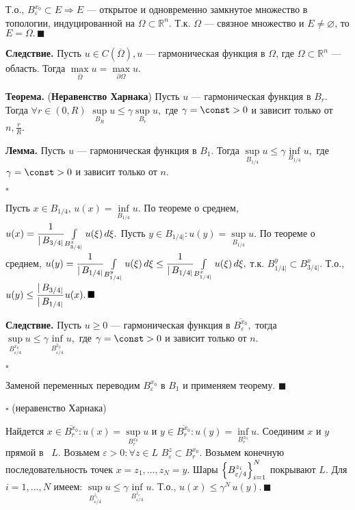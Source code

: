 \documentclass[unicode,12pt,draft]{article}
\begin{document}
Т.о., $B_{\varepsilon}^{x_0}\subset E\Rightarrow E$ --- открытое и
одновременно замкнутое множество в топологии, индуцированной на
$\Omega\subset \mathbb R^n.$ Т.к. $\Omega$ --- связное множество и
$E\ne\varnothing$, то $E=\Omega.\,\blacksquare$

\textbf{Следствие.} Пусть $u\in C(\overline{\Omega}), u$ ---
гармоническая функция в $\Omega$, где $\Omega\subset \mathbb R^n$
--- область. Тогда $\max\limits_{\overline{\Omega}}u=\max\limits_{\partial \Omega}u.$

\textbf{Теорема.} (\textbf{Неравенство Харнака}) Пусть $u$ ---
гармоническая функция в $B_r$. Тогда $\forall r\in (0,R) \,\,
\sup\limits_{B_R}u\le\gamma \sup\limits_{B_r}u,$ где
$\gamma=\const>0$ и зависит только от $n,\frac rR.$

\textbf{Лемма.} Пусть $u$ --- гармоническая функция в $B_1$. Тогда
$\sup\limits_{B_{1/4}}u\le\gamma \inf\limits_{B_{1/4}}u,$ где
$\gamma=\const>0$ и зависит только от $n.$

$\square$

Пусть $x\in B_{1/4},\, u(x)=\inf\limits_{B_{1/4}}u.$ По теореме о
среднем, $u(x)=\cfrac1{|\,B_{3/4|}}\int\limits_{B_{3/4|}^x}
u(\xi)\,d\xi.$ Пусть $y\in B_{1/4|}\colon
u(y)=\sup\limits_{B_{1/4}}u.$ По теореме о среднем,
$u(y)=\cfrac1{|\,B_{1/4|}}\int\limits_{B_{1/4|}^y} u(\xi)\,d\xi\le
\cfrac1{|\,B_{1/4|}}\int\limits_{B_{1/4|}^x} u(\xi)\,d\xi,$ т.к.
$B_{1/4|}^y\subset B_{3/4|}^x$. Т.о., $u(y)\le
\cfrac{|\,B_{3/4|}}{|\,B_{1/4|}}\,u(x).\,\blacksquare$

\textbf{Следствие.} Пусть $u\ge0$ --- гармоническая функция в
$\overline{B_{\varepsilon}^{x_0}},$ тогда
$\sup\limits_{B_{\varepsilon/4}^{x_0}}u\le\gamma
\inf\limits_{\overline{B_{\varepsilon/4}^{x_0}}}u,$ где
$\gamma=\const>0$ и зависит только от $n.$

$\square$

Заменой переменных переводим $B_{\varepsilon}^{x_0}$ в $B_1$ и
применяем теорему. $\blacksquare$

$\square$ (неравенство Харнака)

Найдется $x\in \overline{B_{r}^{x_0}}\colon
u(x)=\sup\limits_{B_{r}^{x_0}}u$ и $y\in
\overline{B_{r}^{x_0}}\colon u(y)=\inf\limits_{B_{r}^{x_0}}u.$
Соединим $x$ и $y$ прямой в~ $L$. Возьмем $\varepsilon>0\colon
\forall z\in L\,\, B_{\varepsilon}^{z}\subset B_{r}^{x_0}.$
Возьмем конечную последовательность точек $x=z_1,\ldots,z_N=y.$
Шары $\Bigl\{ B_{\varepsilon/4}^{z_i} \Bigr\}_{i=1}^N$ покрывают
$L$. Для $i=1,\ldots,N$ имеем:
$\sup\limits_{B_{\varepsilon/4}^{z_i}}u\le\gamma
\inf\limits_{B_{\varepsilon/4}^{z_i}}u.$ Т.о.,
$u(x)\le\gamma^N\,u(y).\,\blacksquare$
\end{document}

